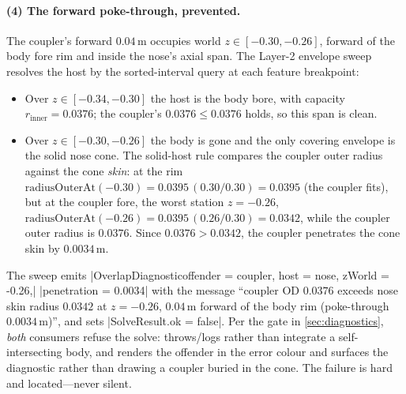 \paragraph{(4) The forward poke-through, prevented.}
The coupler's forward $0.04\,$m occupies world $z \in [-0.30, -0.26]$, forward of the body fore
rim and inside the nose's axial span. The Layer-2 envelope sweep resolves the host by the
sorted-interval query at each feature breakpoint:

\begin{itemize}
  \item Over $z \in [-0.34, -0.30]$ the host is the body bore, with capacity
        $r_{\text{inner}} = 0.0376$; the coupler's $0.0376 \le 0.0376$ holds, so this span is
        clean.
  \item Over $z \in [-0.30, -0.26]$ the body is gone and the only covering envelope is the solid
        nose cone. The solid-host rule compares the coupler outer radius against the cone
        \emph{skin}: at the rim $\text{radiusOuterAt}(-0.30) = 0.0395\,(0.30/0.30) = 0.0395$
        (the coupler fits), but at the coupler fore, the worst station $z = -0.26$,
        $\text{radiusOuterAt}(-0.26) = 0.0395\,(0.26/0.30) = 0.0342$, while the coupler
        outer radius is $0.0376$. Since $0.0376 > 0.0342$, the coupler penetrates the cone
        skin by $0.0034\,$m.
\end{itemize}

\begin{hardfail}
The sweep emits \cppinline|OverlapDiagnostic{offender = coupler, host = nose, zWorld = -0.26,|
\cppinline|penetration = 0.0034}| with the message ``coupler OD $0.0376$ exceeds nose skin
radius $0.0342$ at $z=-0.26$, $0.04\,$m forward of the body rim (poke-through $0.0034\,$m)'', and sets
\cppinline|SolveResult.ok = false|. Per the gate in \cref{sec:diagnostics}, \emph{both}
consumers refuse the solve:  throws/logs rather than integrate a
self-intersecting body, and  renders the offender in the error colour and
surfaces the diagnostic rather than drawing a coupler buried in the cone. The failure is hard
and located---never silent. \fail
\end{hardfail}

